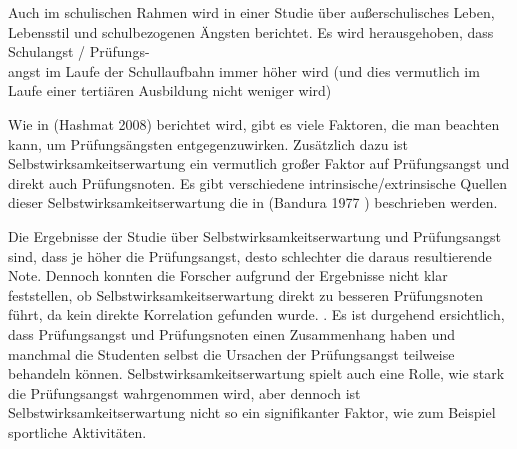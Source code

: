 \documentclass[11pt, a4paper]{article}
\begin{document}
	Auch im schulischen Rahmen wird in einer Studie über außerschulisches Leben, Lebensstil und schulbezogenen Ängsten berichtet. Es wird herausgehoben, dass Schulangst / Prüfungs-\\angst im Laufe der Schullaufbahn immer höher wird (und dies vermutlich im Laufe einer tertiären Ausbildung nicht weniger wird) \cite{pixner2013prufungsangst}

	Wie in (Hashmat 2008) berichtet wird, gibt es viele Faktoren, die man beachten kann, um Prüfungsängsten entgegenzuwirken. Zusätzlich dazu ist Selbstwirksamkeitserwartung ein vermutlich großer Faktor auf Prüfungsangst und direkt auch Prüfungsnoten. Es gibt verschiedene intrinsische/extrinsische Quellen dieser Selbstwirksamkeitserwartung die in (Bandura 1977 \cite{bandura1977self}) beschrieben werden.

	Die Ergebnisse der Studie über Selbstwirksamkeitserwartung und Prüfungsangst sind, dass je höher die Prüfungsangst, desto schlechter die daraus resultierende Note. Dennoch konnten die Forscher aufgrund der Ergebnisse nicht klar feststellen, ob Selbstwirksamkeitserwartung direkt zu besseren Prüfungsnoten führt, da kein direkte Korrelation gefunden wurde. \cite{barrows2013anxiety}. Es ist durgehend ersichtlich, dass Prüfungsangst und Prüfungsnoten einen Zusammenhang haben und manchmal die Studenten selbst die Ursachen der Prüfungsangst teilweise behandeln können. Selbstwirksamkeitserwartung spielt auch eine Rolle, wie stark die Prüfungsangst wahrgenommen wird, aber dennoch ist Selbstwirksamkeitserwartung nicht so ein signifikanter Faktor, wie zum Beispiel sportliche Aktivitäten. \cite{barrows2013anxiety} \cite{hashmat2008factors}
\newpage

{}

\end{document}
